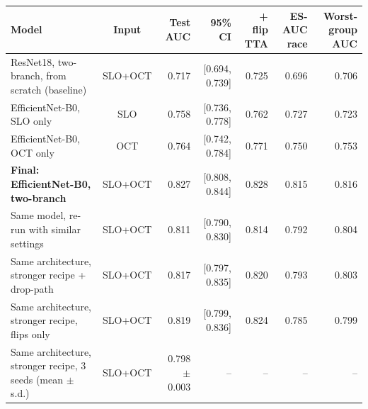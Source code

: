 \begin{tabular}{lcrrrrr}
\toprule
Model & Input & Test AUC & 95\% CI & + flip TTA & ES-AUC race & Worst-group AUC \\
\midrule
ResNet18, two-branch, from scratch (baseline) & SLO+OCT & 0.717 & [0.694, 0.739] & 0.725 & 0.696 & 0.706 \\
\midrule
EfficientNet-B0, SLO only & SLO & 0.758 & [0.736, 0.778] & 0.762 & 0.727 & 0.723 \\
EfficientNet-B0, OCT only & OCT & 0.764 & [0.742, 0.784] & 0.771 & 0.750 & 0.753 \\
\midrule
\textbf{Final: EfficientNet-B0, two-branch} & SLO+OCT & 0.827 & [0.808, 0.844] & 0.828 & 0.815 & 0.816 \\
\midrule
Same model, re-run with similar settings & SLO+OCT & 0.811 & [0.790, 0.830] & 0.814 & 0.792 & 0.804 \\
Same architecture, stronger recipe + drop-path & SLO+OCT & 0.817 & [0.797, 0.835] & 0.820 & 0.793 & 0.803 \\
Same architecture, stronger recipe, flips only & SLO+OCT & 0.819 & [0.799, 0.836] & 0.824 & 0.785 & 0.799 \\
Same architecture, stronger recipe, 3 seeds (mean $\pm$ s.d.) & SLO+OCT & 0.798 $\pm$ 0.003 & -- & -- & -- & -- \\
\bottomrule
\end{tabular}

